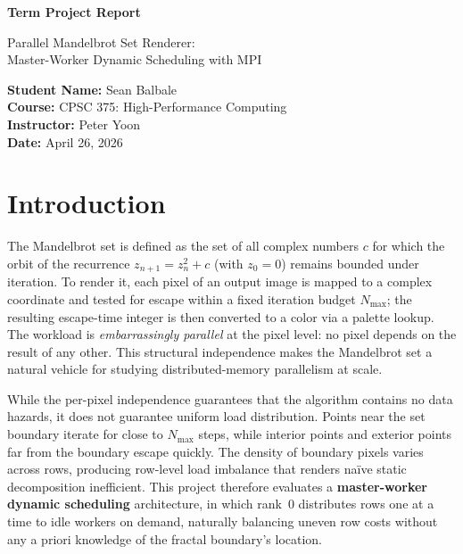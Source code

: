 \documentclass[11pt]{article}
\begin{document}
\begin{titlepage}
  \begin{center}
    \vspace*{1in}

    \Huge
    \textbf{Term Project Report}

    \LARGE
    Parallel Mandelbrot Set Renderer: \\[0.4em] Master-Worker Dynamic Scheduling with MPI

    \vspace{3in}

    \textbf{Student Name:} Sean Balbale
    \\ \textbf{Course:} CPSC 375: High-Performance Computing
    \\ \textbf{Instructor:} Peter Yoon
    \\ \textbf{Date:} April 26, 2026

    \vfill
  \end{center}
\end{titlepage}

\newpage

\section{Introduction}

The Mandelbrot set is defined as the set of all complex numbers $c$ for which
the orbit of the recurrence $z_{n+1} = z_n^2 + c$ (with $z_0 = 0$) remains
bounded under iteration. To render it, each pixel of an output image is mapped
to a complex coordinate and tested for escape within a fixed iteration budget
$N_{\max}$; the resulting escape-time integer is then converted to a color via
a palette lookup. The workload is \textit{embarrassingly parallel} at the pixel
level: no pixel depends on the result of any other. This structural independence
makes the Mandelbrot set a natural vehicle for studying distributed-memory
parallelism at scale.

While the per-pixel independence guarantees that the algorithm contains no data
hazards, it does not guarantee uniform load distribution. Points near the set
boundary iterate for close to $N_{\max}$ steps, while interior points and
exterior points far from the boundary escape quickly. The density of boundary
pixels varies across rows, producing row-level load imbalance that renders
naïve static decomposition inefficient. This project therefore evaluates a
\textbf{master-worker dynamic scheduling} architecture, in which rank~0
distributes rows one at a time to idle workers on demand, naturally balancing
uneven row costs without any a priori knowledge of the fractal boundary's
location.
\end{document}
